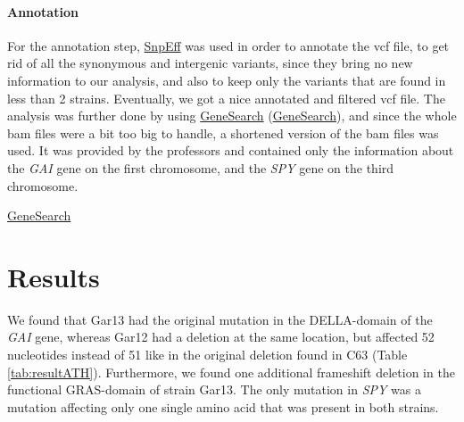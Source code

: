 \documentclass[10pt,a4paper]{article}
\begin{document}
\paragraph{Annotation}
For the annotation step, \href{http://snpeff.sourceforge.net/}{SnpEff} was used in order to annotate the vcf file, to get rid of all the synonymous and intergenic variants, since they bring no new information to our analysis, and also to keep only the variants that are found in less than 2 strains. Eventually, we got a nice annotated and filtered vcf file. The analysis was further done by using \href{http://www.phenosystems.com/www/index.php/products/gensearchngs}{GeneSearch} (\href{http://www.phenosystems.com/www/}{GeneSearch}), and since the whole bam files were a bit too big to handle, a shortened version of the bam files was used. It was provided by the professors and contained only the information about the \textit{GAI} gene on the first chromosome, and the \textit{SPY} gene on the third chromosome.


\href{http://www.phenosystems.com/www/}{GeneSearch}

\section*{\large Results}

We found that Gar13 had the original mutation in the DELLA-domain of the \textit{GAI} gene, whereas Gar12 had a deletion at the same location, but affected 52 nucleotides instead of 51 like in the original deletion found in C63 (Table \ref{tab:resultATH}). Furthermore, we found one additional frameshift deletion in the functional GRAS-domain of strain Gar13. The only mutation in \textit{SPY} was a mutation affecting only one single amino acid that was present in both strains. 
\end{document}
